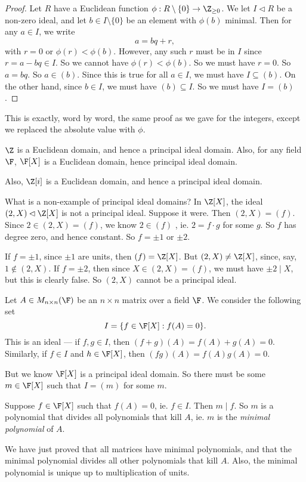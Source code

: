 \documentclass[a4paper]{article}
\begin{document}
\begin{proof}
  Let $R$ have a Euclidean function $\phi: R \setminus \{0\} \to \Z_{\geq 0}$. We let $I \lhd R$ be a non-zero ideal, and let $b \in I\setminus \{0\}$ be an element with $\phi(b)$ minimal. Then for any $a \in I$, we write
  \[
    a = bq + r,
  \]
  with $r = 0$ or $\phi(r) < \phi(b)$. However, any such $r$ must be in $I$ since $r = a - bq \in I$. So we cannot have $\phi(r) < \phi(b)$. So we must have $r = 0$. So $a = bq$. So $a \in (b)$. Since this is true for all $a \in I$, we must have $I \subseteq (b)$. On the other hand, since $b \in I$, we must have $(b) \subseteq I$. So we must have $I = (b)$.
\end{proof}
This is exactly, word by word, the same proof as we gave for the integers, except we replaced the absolute value with $\phi$.

\begin{eg}
  $\Z$ is a Euclidean domain, and hence a principal ideal domain. Also, for any field $\F$, $\F[X]$ is a Euclidean domain, hence principal ideal domain.

  Also, $\Z[i]$ is a Euclidean domain, and hence a principal ideal domain.

  What is a non-example of principal ideal domains? In $\Z[X]$, the ideal $(2, X) \lhd \Z[X]$ is not a principal ideal. Suppose it were. Then $(2, X) = (f)$. Since $2 \in (2, X) = (f)$, we know $2 \in (f)$ , ie. $2 = f\cdot g$ for some $g$. So $f$ has degree zero, and hence constant. So $f = \pm 1$ or $\pm 2$.

  If $f = \pm 1$, since $\pm 1$ are units, then $(f) = \Z[X]$. But $(2, X) \not= \Z[X]$, since, say, $1 \not\in (2, X)$. If $f = \pm 2$, then since $X \in (2, X) = (f)$, we must have $\pm 2 \mid X$, but this is clearly false. So $(2, X)$ cannot be a principal ideal.
\end{eg}

\begin{eg}
  Let $A \in M_{n \times n}(\F)$ be an $n \times n$ matrix over a field $\F$. We consider the following set
  \[
    I = \{f \in \F[X]: f(A) = 0\}.
  \]
  This is an ideal --- if $f, g \in I$, then $(f + g)(A) = f(A) + g(A) = 0$. Similarly, if $f \in I$ and $h \in \F[X]$, then $(fg)(A) = f(A)g(A) = 0$.

  But we know $\F[X]$ is a principal ideal domain. So there must be some $m \in \F[X]$ such that $I = (m)$ for some $m$.

  Suppose $f \in \F[X]$ such that $f(A) = 0$, ie. $f \in I$. Then $m \mid f$. So $m$ is a polynomial that divides all polynomials that kill $A$, ie. $m$ is the \emph{minimal polynomial} of $A$.

  We have just proved that all matrices have minimal polynomials, and that the minimal polynomial divides all other polynomials that kill $A$. Also, the minimal polynomial is unique up to multiplication of units.
\end{eg}
\end{document}
